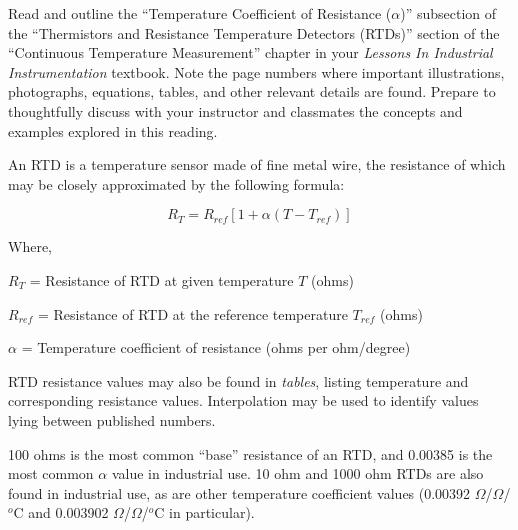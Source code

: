 

Read and outline the ``Temperature Coefficient of Resistance ($\alpha$)'' subsection of the ``Thermistors and Resistance Temperature Detectors (RTDs)'' section of the ``Continuous Temperature Measurement'' chapter in your {\it Lessons In Industrial Instrumentation} textbook.  Note the page numbers where important illustrations, photographs, equations, tables, and other relevant details are found.  Prepare to thoughtfully discuss with your instructor and classmates the concepts and examples explored in this reading.















An RTD is a temperature sensor made of fine metal wire, the resistance of which may be closely approximated by the following formula:

$$R_T = R_{ref}[1 + \alpha(T - T_{ref})]$$

\noindent
Where,

$R_T$ = Resistance of RTD at given temperature $T$ (ohms)

$R_{ref}$ = Resistance of RTD at the reference temperature $T_{ref}$ (ohms)

$\alpha$ = Temperature coefficient of resistance (ohms per ohm/degree)

\vskip 10pt

RTD resistance values may also be found in {\it tables}, listing temperature and corresponding resistance values.  Interpolation may be used to identify values lying between published numbers.

\vskip 10pt

100 ohms is the most common ``base'' resistance of an RTD, and 0.00385 is the most common $\alpha$ value in industrial use.  10 ohm and 1000 ohm RTDs are also found in industrial use, as are other temperature coefficient values (0.00392 $\Omega$/$\Omega$/$^{o}$C and 0.003902 $\Omega$/$\Omega$/$^{o}$C in particular).











